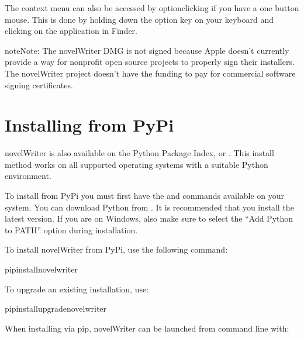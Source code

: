 \documentclass[a4paper,11pt,english]{sphinxmanual}
\begin{document}
\sphinxAtStartPar
The context menu can also be accessed by option\sphinxhyphen{}clicking if you have a one button mouse. This is
done by holding down the option key on your keyboard and clicking on the application in Finder.

\begin{sphinxadmonition}{note}{Note:}
\sphinxAtStartPar
The novelWriter DMG is not signed because Apple doesn’t currently provide a way for non\sphinxhyphen{}profit
open source projects to properly sign their installers. The novelWriter project doesn’t have the
funding to pay for commercial software signing certificates.
\end{sphinxadmonition}


\section{Installing from PyPi}
\label{\detokenize{int_started:installing-from-pypi}}\label{\detokenize{int_started:a-started-pip}}
\sphinxAtStartPar
novelWriter is also available on the Python Package Index, or . This install method works on
all supported operating systems with a suitable Python environment.

\sphinxAtStartPar
To install from PyPi you must first have the  and  commands available on your
system. You can download Python from . It is recommended that you install the latest
version. If you are on Windows, also make sure to select the “Add Python to PATH” option during
installation.

\sphinxAtStartPar
To install novelWriter from PyPi, use the following command:

\begin{sphinxVerbatim}[commandchars=\\\{\}]
pipinstallnovelwriter
\end{sphinxVerbatim}

\sphinxAtStartPar
To upgrade an existing installation, use:

\begin{sphinxVerbatim}[commandchars=\\\{\}]
pipinstall\PYGZhy{}\PYGZhy{}upgradenovelwriter
\end{sphinxVerbatim}

\sphinxAtStartPar
When installing via pip, novelWriter can be launched from command line with:
\end{document}

